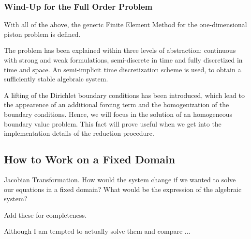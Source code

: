 \documentclass[../../thesis.tex]{subfiles}
\begin{document}
\subsubsection{Wind-Up for the Full Order Problem}
With all of the above, the generic Finite Element Method for the one-dimensional piston problem is defined.

The problem has been explained within three levels of abstraction: continuous with strong and weak formulations, semi-discrete in time and fully discretized in time and space.
An semi-implicit time discretization scheme is used, to obtain a sufficiently stable algebraic system.

A lifting of the Dirichlet boundary conditions has been introduced, which lead to the appearence of an additional forcing term and the homogenization of the boundary conditions.
Hence, we will focus in the solution of an homogeneous boundary value problem.
This fact will prove useful when we get into the implementation details of the reduction procedure.

\subsection{How to Work on a Fixed Domain}

Jacobian Transformation.
How would the system change if we wanted to solve our equations in a fixed domain?
What would be the expression of the algebraic system?

Add these for completeness.

Although I am tempted to actually solve them and compare ... 
\end{document}
